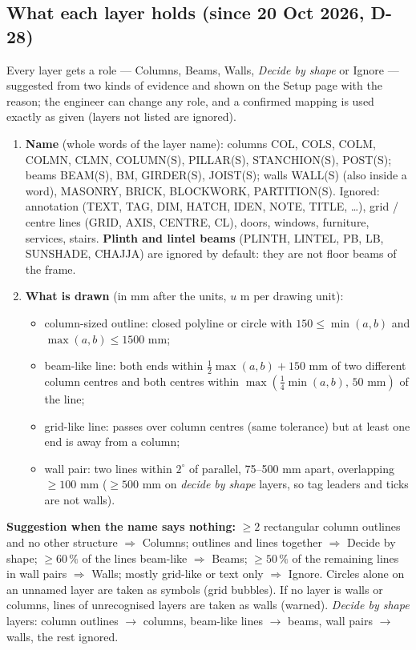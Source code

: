 \documentclass[10pt,a4paper]{article}
\begin{document}
\subsection{What each layer holds (since 20 Oct 2026, D-28)}
Every layer gets a role --- Columns, Beams, Walls, \emph{Decide by shape} or Ignore --- suggested from two kinds of
evidence and shown on the Setup page with the reason; the engineer can change any role, and a confirmed mapping is
used exactly as given (layers not listed are ignored).
\begin{enumerate}
\item \textbf{Name} (whole words of the layer name): columns COL, COLS, COLM, COLMN, CLMN, COLUMN(S), PILLAR(S),
STANCHION(S), POST(S); beams BEAM(S), BM, GIRDER(S), JOIST(S); walls WALL(S) (also inside a word), MASONRY, BRICK,
BLOCKWORK, PARTITION(S). Ignored: annotation (TEXT, TAG, DIM, HATCH, IDEN, NOTE, TITLE, \dots), grid / centre lines
(GRID, AXIS, CENTRE, CL), doors, windows, furniture, services, stairs. \textbf{Plinth and lintel beams} (PLINTH,
LINTEL, PB, LB, SUNSHADE, CHAJJA) are ignored by default: they are not floor beams of the frame.
\item \textbf{What is drawn} (in mm after the units, $u$ m per drawing unit):
\begin{itemize}
\item column-sized outline: closed polyline or circle with $150\le\min(a,b)$ and $\max(a,b)\le1500$ mm;
\item beam-like line: both ends within $\tfrac12\max(a,b)+150$ mm of two different column centres and both centres
within $\max(\tfrac14\min(a,b),\,50\text{ mm})$ of the line;
\item grid-like line: passes over column centres (same tolerance) but at least one end is away from a column;
\item wall pair: two lines within $2^\circ$ of parallel, 75--500 mm apart, overlapping $\ge100$ mm ($\ge500$ mm on
\emph{decide by shape} layers, so tag leaders and ticks are not walls).
\end{itemize}
\end{enumerate}
\textbf{Suggestion when the name says nothing:} $\ge2$ rectangular column outlines and no other structure
$\Rightarrow$ Columns; outlines and lines together $\Rightarrow$ Decide by shape; $\ge60\,\%$ of the lines
beam-like $\Rightarrow$ Beams; $\ge50\,\%$ of the remaining lines in wall pairs $\Rightarrow$ Walls; mostly grid-like
or text only $\Rightarrow$ Ignore. Circles alone on an unnamed layer are taken as symbols (grid bubbles). If no layer
is walls or columns, lines of unrecognised layers are taken as walls (warned). \emph{Decide by shape} layers:
column outlines $\to$ columns, beam-like lines $\to$ beams, wall pairs $\to$ walls, the rest ignored.
\end{document}
